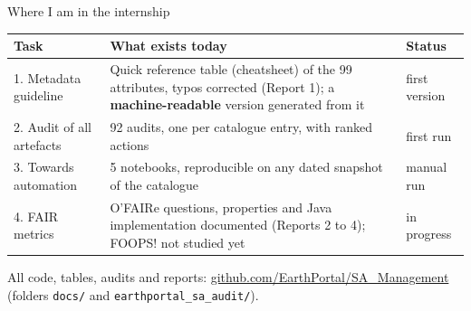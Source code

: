 \documentclass[aspectratio=169,10pt]{beamer}
\newcommand{\evidence}[1]{{\scriptsize\color{dtgrey}#1}}
\newcommand{\code}[1]{{\color{dtblue}\texttt{#1}}}
\begin{document}
\begin{frame}{Where I am in the internship}
  \small
  \begin{tabularx}{\textwidth}{@{}l X l@{}}
    \toprule
    \textbf{Task} & \textbf{What exists today} & \textbf{Status}\\
    \midrule
    1. Metadata guideline & Quick reference table (cheatsheet) of the 99 attributes, typos corrected
                          (Report 1); a \textbf{machine-readable} version generated from it & first version\\
    2. Audit of all artefacts & 92 audits, one per catalogue entry, with ranked actions & first run\\
    3. Towards automation & 5 notebooks, reproducible on any dated snapshot of the catalogue & manual run\\
    4. FAIR metrics & O'FAIRe questions, properties and Java implementation documented (Reports 2 to 4);
                      FOOPS! not studied yet & in progress\\
    \bottomrule
  \end{tabularx}
  \vfill
  \evidence{All code, tables, audits and reports:
    \href{https://github.com/EarthPortal/SA_Management}{github.com/EarthPortal/SA\_Management}
    (folders \code{docs/} and \code{earthportal\_sa\_audit/}).}
\end{frame}
\end{document}
